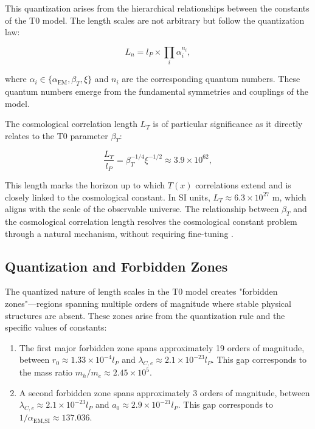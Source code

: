 \documentclass[twocolumn,aps,prl]{revtex4-2}
\begin{document}
	This quantization arises from the hierarchical relationships between the constants of the T0 model. The length scales are not arbitrary but follow the quantization law:
	
	\begin{equation}
		L_n = l_P \times \prod_i \alpha_i^{n_i}, \label{eq:detailed_quantization}
	\end{equation}
	
	where $\alpha_i \in \{\alpha_{\text{EM}}, \beta_T, \xi\}$ and $n_i$ are the corresponding quantum numbers. These quantum numbers emerge from the fundamental symmetries and couplings of the model.
	
	The cosmological correlation length $L_T$ is of particular significance as it directly relates to the T0 parameter $\beta_T$:
	
	\begin{equation}
		\frac{L_T}{l_P} = \beta_T^{-1/4} \xi^{-1/2} \approx 3.9 \times 10^{62}, \label{eq:correlation_length}
	\end{equation}
	
	This length marks the horizon up to which $T(x)$ correlations extend and is closely linked to the cosmological constant. In SI units, $L_T \approx 6.3 \times 10^{27}$ m, which aligns with the scale of the observable universe. The relationship between $\beta_T$ and the cosmological correlation length resolves the cosmological constant problem through a natural mechanism, without requiring fine-tuning \cite{pascher_energiedynamik_2025}.
	
	\subsection{Quantization and Forbidden Zones}
	\label{subsec:quantization}
	
	The quantized nature of length scales in the T0 model creates "forbidden zones"—regions spanning multiple orders of magnitude where stable physical structures are absent. These zones arise from the quantization rule and the specific values of constants:
	
	\begin{enumerate}
		\item The first major forbidden zone spans approximately 19 orders of magnitude, between $r_0 \approx 1.33 \times 10^{-4} l_P$ and $\lambda_{C,e} \approx 2.1 \times 10^{-23} l_P$. This gap corresponds to the mass ratio $m_h/m_e \approx 2.45 \times 10^5$.
		\item A second forbidden zone spans approximately 3 orders of magnitude, between $\lambda_{C,e} \approx 2.1 \times 10^{-23} l_P$ and $a_0 \approx 2.9 \times 10^{-21} l_P$. This gap corresponds to $1/\alpha_{\text{EM,SI}} \approx 137.036$.
	\end{enumerate}
	
\end{document}
